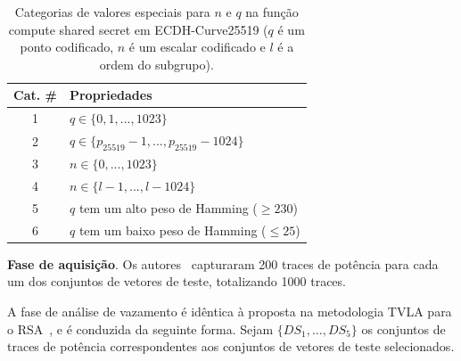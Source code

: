 \begin{table}[htb]\scriptsize
	\caption{Categorias de valores especiais para $n$ e $q$ na função compute shared secret em ECDH-Curve25519 ($q$ é um ponto codificado, $n$ é um escalar codificado e $l$ é a ordem do subgrupo).}
	\label{tbSpecialValuesECDH}
	\begin{center}
		\bgroup
		\def\arraystretch{\tblvertpaddingfactor} %
		\setlength{\tabcolsep}{\tblhorizpadding} %
		\begin{tabular}{|c|l|}
			\hline
			Cat. \#	& Propriedades	\\ \hline \hline
			1		& $q \in \{0,1,...,1023\}$	\\ \hline 
			2		& $q \in \{p_{25519}-1,...,p_{25519}-1024\}$	\\ \hline 
			3		& $n \in \{0,...,1023\}$	\\ \hline
			4		& $n \in \{l-1,...,l-1024\}$	\\ \hline 
			5		& $q$ tem um alto peso de Hamming ($\geq 230$) \\ \hline
			6		& $q$ tem um baixo peso de Hamming ($\leq 25$) \\ \hline
		\end{tabular}
		\egroup
	\end{center} 
\end{table}

%
\noindent \textbf{Fase de aquisição}. Os autores~\cite{Nascimento2015_Space} capturaram 200 traces de potência para cada um dos conjuntos de vetores de teste, totalizando 1000 traces.
%

%
A fase de análise de vazamento é idêntica à proposta na metodologia TVLA para o RSA~\cite{Witteman2011}, e é conduzida da seguinte forma. Sejam $\{DS_1,\ldots,DS_5\}$ os conjuntos de traces de potência correspondentes aos conjuntos de vetores de teste selecionados.
%

%

